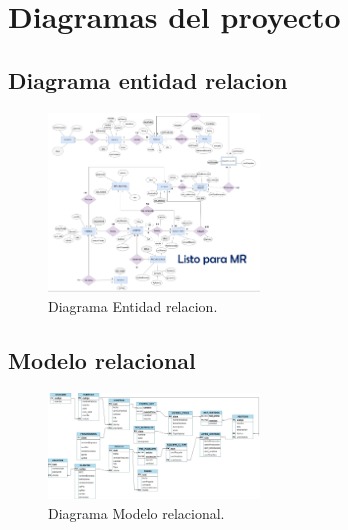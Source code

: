 \documentclass[12pt,a4paper]{article}
\begin{document}
	\section{Diagramas del proyecto}
	
	\subsection{Diagrama entidad relacion}
	\begin{figure}[h]
		\centering
		\includegraphics[width=0.5\textwidth]{der.png}
		\caption{Diagrama Entidad relacion.}
		\label{fig: 1. Diagrama Entidad relacion.}
	\end{figure}
	
	
	\subsection{Modelo relacional}
	\begin{figure}[h]
		\centering
		\includegraphics[width=0.5\textwidth]{mrgalatex.jpeg}
		\caption{Diagrama Modelo relacional.}
		\label{fig: 2. Modelo relacional.}
	\end{figure}
	\newpage
\end{document}
